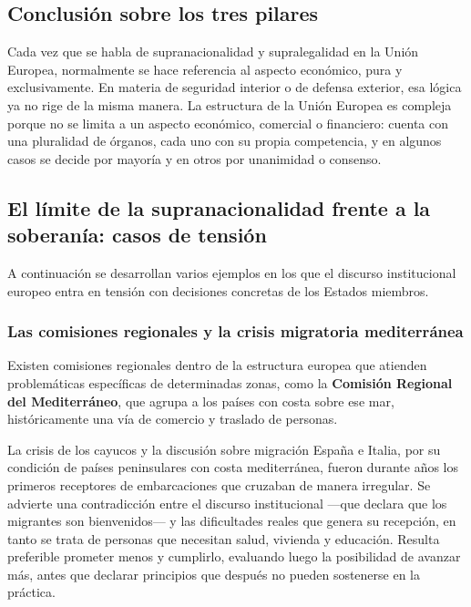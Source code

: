 \documentclass[12pt,oneside]{book}
\begin{document}
\subsection{Conclusión sobre los tres pilares}

\begin{important}
Cada vez que se habla de supranacionalidad y supralegalidad en la Unión Europea, normalmente se hace referencia al aspecto económico, pura y exclusivamente. En materia de seguridad interior o de defensa exterior, esa lógica ya no rige de la misma manera. La estructura de la Unión Europea es compleja porque no se limita a un aspecto económico, comercial o financiero: cuenta con una pluralidad de órganos, cada uno con su propia competencia, y en algunos casos se decide por mayoría y en otros por unanimidad o consenso.
\end{important}

\subsection{El límite de la supranacionalidad frente a la soberanía: casos de tensión}

A continuación se desarrollan varios ejemplos en los que el discurso institucional europeo entra en tensión con decisiones concretas de los Estados miembros.

\subsubsection{Las comisiones regionales y la crisis migratoria mediterránea}

Existen comisiones regionales dentro de la estructura europea que atienden problemáticas específicas de determinadas zonas, como la \textbf{Comisión Regional del Mediterráneo}, que agrupa a los países con costa sobre ese mar, históricamente una vía de comercio y traslado de personas.

\begin{example}{La crisis de los cayucos y la discusión sobre migración}
España e Italia, por su condición de países peninsulares con costa mediterránea, fueron durante años los primeros receptores de embarcaciones que cruzaban de manera irregular. Se advierte una contradicción entre el discurso institucional —que declara que los migrantes son bienvenidos— y las dificultades reales que genera su recepción, en tanto se trata de personas que necesitan salud, vivienda y educación. Resulta preferible prometer menos y cumplirlo, evaluando luego la posibilidad de avanzar más, antes que declarar principios que después no pueden sostenerse en la práctica.
\end{example}
\end{document}
